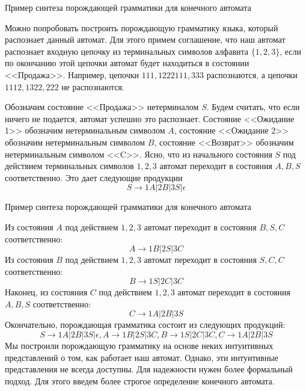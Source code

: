 \documentclass[12pt, pdf, hyperref={unicode},handout]{beamer}
\begin{document}
\begin{frame}{Пример синтеза порождающей грамматики для конечного автомата}
  \begin{block}

    \small{
      Можно попробовать построить порождающую грамматику языка, который распознает данный автомат. Для этого примем соглашение, что наш автомат распознает входную цепочку из терминальных символов алфавита $\{1, 2, 3\}$, если по окончанию этой цепочки автомат будет находиться в состоянии <<Продажа>>. Например, цепочки $111, 1222111, 333$ распознаются, а цепочки $1112, 1322, 222$ не распознаются.

      Обозначим  состояние <<Продажа>> нетерминалом $S$. Будем считать, что если ничего не подается, автомат успешно это распознает. Состояние <<Ожидание 1>> обозначим нетерминальным символом $A$, состояние <<Ожидание 2>> обозначим нетерминальным символом $B$, состояние <<Возврат>> обозначим нетерминальным символом <<C>>. Ясно, что из начального состояния $S$ под действием терминальных символов $1,2,3$ автомат переходит в состояния $A,B,S$ соответственно. Это дает следующие продукции $$S\rightarrow 1A|2B|3S|\epsilon$$
      
}

  \end{block}
  
\end{frame}

\begin{frame}{Пример синтеза порождающей грамматики для конечного автомата}
  \begin{block}

    \small{
      
      Из состояния $A$ под действием $1,2,3$ автомат переходит  в состояния $B,S,C$ соответственно: $$A\rightarrow 1B|2S|3C$$
      Из состояния $B$ под действием $1,2,3$ автомат переходит  в состояния $S,C,C$ соответственно: $$B\rightarrow 1S|2C|3C$$
      Наконец, из состояния $C$ под действием $1,2,3$ автомат переходит  в состояния $A,B,S$ соответственно:$$C\rightarrow 1A|2B|3S$$
      Окончательно, порождающая грамматика состоит из следующих продукций:
      $$S\rightarrow 1A|2B|3S|\epsilon, A\rightarrow 1B|2S|3C, B\rightarrow 1S|2C|3C, C\rightarrow 1A|2B|3S$$
Мы построили порождающую грамматику на основе неких интуитивных представлений о том, как работает наш автомат. Однако, эти интуитивные представления не всегда доступны. Для надежности нужен более формальный подход. Для этого введем более строгое определение конечного автомата.
}

  \end{block}
  
\end{frame}
\end{document}

